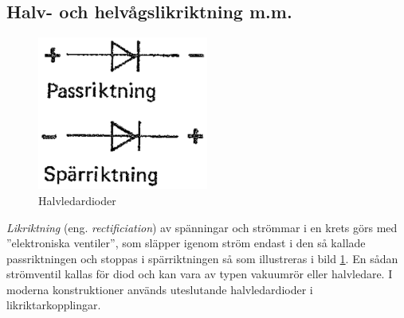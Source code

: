 \subsection{Halv- och helvågslikriktning m.m.}

\begin{figure}
\includegraphics[width=0.5\textwidth]{images/cropped_pdfs/bild_2_3-34.pdf}
\caption{Halvledardioder}
\label{fig:BildII3-34}
\end{figure}

\emph{Likriktning} (eng. \emph{rectificiation}) av spänningar och strömmar i en
krets görs med ''elektroniska ventiler'', som släpper igenom ström endast i den
så kallade passriktningen och stoppas i spärriktningen så som illustreras i
bild \ref{fig:BildII3-34}.
En sådan strömventil kallas för diod och kan vara av typen vakuumrör eller
halvledare.
I moderna konstruktioner används uteslutande halvledardioder i
likriktarkopplingar.

